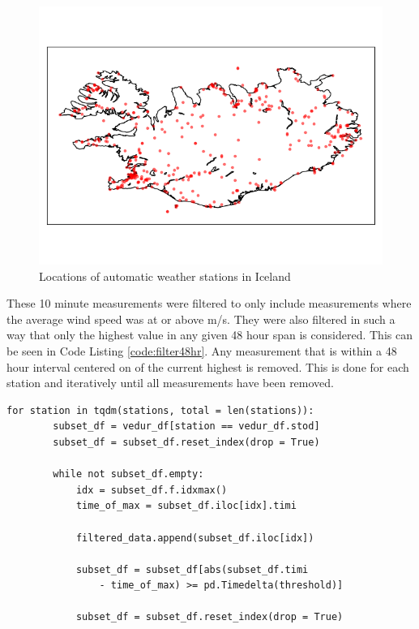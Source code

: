 \begin{figure}
    \includegraphics[scale = 0.75]{Figures/weather_stations_2024-04-09.png}
    \caption{Locations of automatic weather stations in Iceland}
    \label{fig:aws_map}
\end{figure}

These 10 minute measurements were filtered to only include measurements where the average wind speed was at or above \averageWindSpeedLimit m/s. They were also filtered in such a way that only the highest value in any given 48 hour span is considered. This can be seen in Code Listing \ref{code:filter48hr}. Any measurement that is within a 48 hour interval centered on of the current highest is removed. This is done for each station and iteratively until all measurements have been removed.

\begin{lstlisting}[style = Python, caption = {Filter points over 48 hour interval}, label = code:filter48hr]
    for station in tqdm(stations, total = len(stations)):
        subset_df = vedur_df[station == vedur_df.stod]
        subset_df = subset_df.reset_index(drop = True)

        while not subset_df.empty:
            idx = subset_df.f.idxmax()
            time_of_max = subset_df.iloc[idx].timi

            filtered_data.append(subset_df.iloc[idx])

            subset_df = subset_df[abs(subset_df.timi 
                - time_of_max) >= pd.Timedelta(threshold)]

            subset_df = subset_df.reset_index(drop = True)  
\end{lstlisting}


